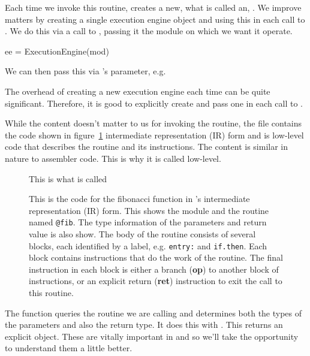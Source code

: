 \documentclass[article]{jss}
\def\Rllvm{\Rpkg{Rllvm}}
\def\Ins#1{\textbf{#1}}
\begin{document}
Each time we invoke this routine, \Rllvm creates a new, what is called
an, . We improve matters by creating 
a single execution engine object and using this in each call
to . We do this via a call to ,
passing it the module on which we want it operate. %
\begin{RCode}
ee = ExecutionEngine(mod)  
\end{RCode}
We can then pass this via 's  parameter, e.g.
The overhead of creating a new execution engine each time can be quite
significant.  Therefore, it is good to explicitly create and pass
one in each call to . %


While the content doesn't matter to us for invoking the routine, the
 file contains the code shown in figure~\ref{fig:IRCodeDisplay}
intermediate representation (IR) form and is low-level code that
describes the routine and its instructions.  The content is similar in
nature to assembler code. This is why it is called low-level.
\begin{figure}
 This is what is called  
  \caption{This is the code for the fibonacci function
in \llvm's intermediate representation (IR) form.
This shows the module and the routine named \texttt{@fib}.
The type information of the parameters and return value is also show.
The body of the routine consists of several blocks, each identified
by a label, e.g. \texttt{entry:} and \texttt{if.then}.
Each block contains instructions that do the work of the routine.
The final instruction in each block is either a branch (\Ins{op})
to another block of instructions, or an explicit return (\Ins{ret})
instruction to exit the call to this routine.
}\label{fig:IRCodeDisplay}
\end{figure}

The  function queries the routine we are calling and
determines both the types of the parameters and also the return type.
It does this with .  This returns an explicit
 object. These are vitally important in \llvm{} and
so we'll take the opportunity to understand them a little better.


\end{document}
